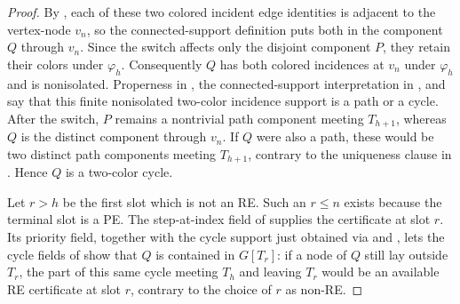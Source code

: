 \begin{proof}
By , each of these two colored incident edge
identities is adjacent to the vertex-node \(v_n\), so the connected-support
definition  puts both in the component \(Q\)
through \(v_n\).  Since the switch affects only the disjoint component \(P\), they
retain their colors under \(\varphi_h\).  Consequently \(Q\) has both
colored incidences at \(v_n\) under \(\varphi_h\) and is nonisolated.
Properness in , the connected-support
interpretation in , and
 say that this finite nonisolated
two-color incidence support is a path or a cycle.  After the switch, \(P\) remains
a nontrivial path component meeting \(T_{h+1}\), whereas \(Q\) is the
distinct component through \(v_n\).  If \(Q\) were also a path, these
would be two distinct path components meeting \(T_{h+1}\), contrary to
the uniqueness clause in .  Hence \(Q\) is a
two-color cycle.

Let \(r>h\) be the first slot which is not an RE.  Such an \(r\leq n\)
exists because the terminal slot is a PE.  The step-at-index field of
 supplies the certificate at slot \(r\).  Its
priority field, together with the cycle support just obtained via
 and , lets the
cycle fields of  show that \(Q\) is contained in
\(G[T_r]\): if a node of \(Q\) still lay outside \(T_r\), the part of this
same cycle meeting \(T_h\) and leaving \(T_r\) would be an available RE
certificate at slot \(r\), contrary to the choice of \(r\) as non-RE.


\end{proof}
